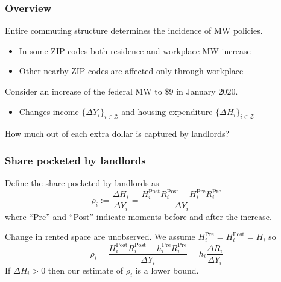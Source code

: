 \documentclass[aspectratio=169, t]{beamer}
\newcommand{\Z}{\mathcal{Z}}
\newcommand{\pre}{\text{Pre}}
\newcommand{\post}{\text{Post}}
\begin{document}
\begin{frame}
    \frametitle{Overview}
    
    Entire commuting structure determines the incidence of MW policies.
    \begin{itemize}
        \vspace{1mm}
        \item In some ZIP codes both residence and workplace MW increase
        \vspace{1mm}
        \item Other nearby ZIP codes are affected only through workplace
    \end{itemize}
    
    \pause
    \vspace{3mm}
    Consider an increase of the federal MW to \$9 in January 2020.
    \begin{itemize}
        \vspace{1mm}
        \item Changes income $\{\Delta Y_i\}_{i\in\Z}$ and housing expenditure $\{\Delta H_i\}_{i\in\Z}$
    \end{itemize}
    
    \pause
    \vspace{3mm}
    How much out of each extra dollar is captured by landlords?
   
\end{frame}

\begin{frame}
    \frametitle{Share pocketed by landlords}

    Define the share pocketed by landlords as 
    \begin{equation*}
        \rho_i := \frac{\Delta H_i}{\Delta Y_i} =  \frac{H^{\post}_i R^{\post}_i - H^{\pre}_i R^{\pre}_i}{\Delta Y_i}
    \end{equation*}
    where ``Pre'' and ``Post'' indicate moments before and after the increase.

    \pause
    \vspace{3mm}
    Change in rented space are unobserved. We assume $H^{\pre}_i = H^{\post}_i = H_i$ so
    \begin{equation*}
        \rho_i = \frac{H^{\post}_i R^{\post}_i - h^{\pre}_i R^{\pre}_i}{\Delta Y_i} = h_i \frac{\Delta R_i}{\Delta Y_i}
    \end{equation*}
    If $\Delta H_i > 0$ then our estimate of $\rho_i$ is a lower bound.

\end{frame}
\end{document}
